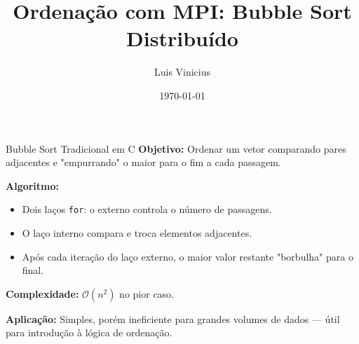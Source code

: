 \documentclass{beamer}
\title{Ordenação com MPI: Bubble Sort Distribuído}
\author{Luis Vinicius}
\date{\today}
\begin{document}
\frame{\titlepage}


\begin{frame}{Bubble Sort Tradicional em C}
\textbf{Objetivo:} Ordenar um vetor comparando pares adjacentes e "empurrando" o maior para o fim a cada passagem.

\vspace{1em}
\textbf{Algoritmo:}
\begin{itemize}
    \item Dois laços \texttt{for}: o externo controla o número de passagens.
    \item O laço interno compara e troca elementos adjacentes.
    \item Após cada iteração do laço externo, o maior valor restante "borbulha" para o final.
\end{itemize}

\vspace{0.5em}
\textbf{Complexidade:} $\mathcal{O}(n^2)$ no pior caso.

\vspace{0.5em}
\textbf{Aplicação:} Simples, porém ineficiente para grandes volumes de dados — útil para introdução à lógica de ordenação.
\end{frame}
\end{document}
